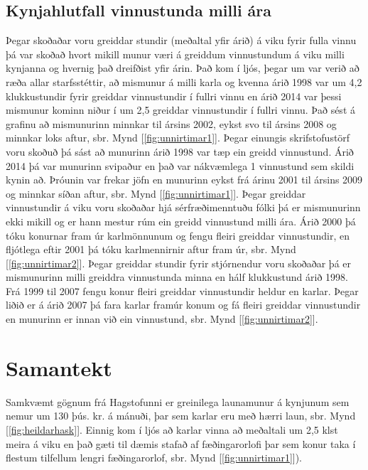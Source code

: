 \documentclass[12pt, git, draft]{rureport}
\begin{document}
\subsection{Kynjahlutfall vinnustunda milli ára}
Þegar skoðaðar voru greiddar stundir (meðaltal yfir árið) á viku fyrir fulla vinnu þá var skoðað hvort mikill munur væri á greiddum vinnustundum á viku milli kynjanna og hvernig það dreifðist yfir árin. 
Það kom í ljós, þegar um var verið að ræða allar starfsstéttir, að mismunur á milli karla og kvenna árið 1998 var um 4,2 klukkustundir fyrir greiddar vinnustundir í fullri vinnu en árið 2014 var þessi mismunur kominn niður í um 2,5 greiddar vinnustundir í fullri vinnu.
Það sést á grafinu að mismunurinn minnkar til ársins 2002, eykst svo til ársins 2008 og minnkar loks aftur, sbr. Mynd [\ref{fig:unnirtimar1}]. 
\newline
\newline
Þegar einungis skrifstofustörf voru skoðuð þá sást að munurinn árið 1998 var tæp ein greidd vinnustund. Árið 2014 þá var munurinn svipaður en það var nákvæmlega 1 vinnustund sem skildi kynin að.
Þróunin var frekar jöfn en munurinn eykst frá árinu 2001  til ársins 2009 og minnkar síðan aftur, sbr. Mynd [\ref{fig:unnirtimar1}].
\newline
\newline
Þegar greiddar vinnustundir á viku voru skoðaðar hjá sérfræðimenntuðu fólki þá er mismunurinn ekki mikill og er hann mestur rúm ein greidd vinnustund milli ára. Árið 2000 þá tóku konurnar fram úr karlmönnunum og fengu fleiri greiddar vinnustundir, en fljótlega eftir 2001 þá tóku karlmennirnir aftur fram úr, sbr. Mynd [\ref{fig:unnirtimar2}].
\newline
\newline
Þegar greiddar stundir fyrir stjórnendur voru skoðaðar þá er mismunurinn milli greiddra vinnustunda minna en hálf klukkustund árið 1998. Frá 1999 til 2007 fengu konur fleiri greiddar vinnustundir heldur en karlar. Þegar liðið er á árið 2007 þá fara karlar framúr konum og fá fleiri greiddar vinnustundir en munurinn er innan við ein vinnustund, sbr. Mynd [\ref{fig:unnirtimar2}]. 

\section{Samantekt}

Samkvæmt gögnum frá Hagstofunni \cite{H} er greinilega launamunur á kynjunum sem nemur um 130 þús. kr. á mánuði, þar sem karlar eru með hærri laun, sbr. Mynd [\ref{fig:heildarhask}]. Einnig kom í ljós að karlar vinna að meðaltali um 2,5 klst meira á viku en það gæti til dæmis stafað af fæðingarorlofi þar sem konur taka í flestum tilfellum lengri fæðingarorlof, sbr. Mynd [\ref{fig:unnirtimar1}]). \\
\end{document}
